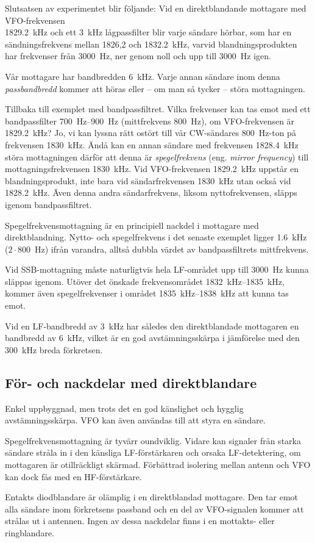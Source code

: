 Slutsatsen av experimentet blir följande:
Vid en direktblandande mottagare med VFO-frekvensen \\ \qty{1829,2}{\kilo\hertz}
och ett \qty{3}{\kilo\hertz} lågpassfilter blir varje sändare hörbar, som har en
sändningsfrekvens mellan 1826,2 och \qty{1832,2}{\kilo\hertz}, varvid
blandningsprodukten har frekvenser från \qty{3000}{\hertz}, ner genom noll och
upp till \qty{3000}{\hertz} igen.

Vår mottagare har bandbredden \qty{6}{\kilo\hertz}.
Varje annan sändare inom denna \emph{passbandbredd} kommer att höras eller --
om man så tycker -- störa mottagningen.

Tillbaka till exemplet med bandpassfiltret.
Vilka frekvenser kan tas emot med ett bandpassfilter \SIrange{700}{900}{\hertz}
(mittfrekvens \qty{800}{\hertz}), om VFO-frekvensen är \qty{1829,2}{\kilo\hertz}?
Jo, vi kan lyssna rätt ostört till vår CW-sändares \qty{800}{\hertz}-ton på
frekvensen \qty{1830}{\kilo\hertz}.
Ändå kan en annan sändare med frekvensen \qty{1828,4}{\kilo\hertz} störa
mottagningen därför att denna är \emph{spegelfrekvens} (eng. \emph{mirror
frequency}) till mottagningsfrekvensen \qty{1830}{\kilo\hertz}.
Vid VFO-frekvensen \qty{1829,2}{\kilo\hertz} uppstår en blandningsprodukt, inte
bara vid sändarfrekvensen \qty{1830}{\kilo\hertz} utan också vid
\qty{1828,2}{\kilo\hertz}.
Även denna andra sändarfrekvens, liksom nyttofrekvensen, släpps igenom
bandpassfiltret.

Spegelfrekvensmottagning är en principiell nackdel i mottagare med
direktblandning.
Nytto- och spegelfrekvens i det senaste exemplet ligger
\qty{1,6}{\kilo\hertz} ($2\cdot 800$~\unit{\hertz}) ifrån varandra, alltså
dubbla värdet av bandpassfiltrets mittfrekvens.

Vid SSB-mottagning måste naturligtvis hela LF-området upp till
\qty{3000}{\hertz} kunna släppas igenom.
Utöver det önskade frekvensområdet \SIrange{1832}{1835}{\kilo\hertz}, kommer
även spegelfrekvenser i området \SIrange{1835}{1838}{\kilo\hertz} att kunna tas
emot.

Vid en LF-bandbredd av \qty{3}{\kilo\hertz} har således den direktblandade
mottagaren en bandbredd av \qty{6}{\kilo\hertz}, vilket är en god
avstämningsskärpa i jämförelse med den \qty{300}{\kilo\hertz} breda förkretsen.

\subsection{För- och nackdelar med direkt\-blandare}

Enkel uppbyggnad, men trots det en god känslighet och hygglig avstämningsskärpa.
VFO kan även användas till att styra en sändare.

Spegelfrekvensmottagning är tyvärr oundviklig.
Vidare kan signaler från starka sändare stråla in i den känsliga LF-förstärkaren
och orsaka LF-detektering, om mottagaren är otillräckligt skärmad.
Förbättrad isolering mellan antenn och VFO kan dock fås med en HF-förstärkare.

Entakts diodblandare är olämplig i en direktblandad mottagare.
Den tar emot alla sändare inom förkretsens passband och en del av VFO-signalen
kommer att strålas ut i antennen.
Ingen av dessa nackdelar finns i en mottakts- eller ringblandare.
